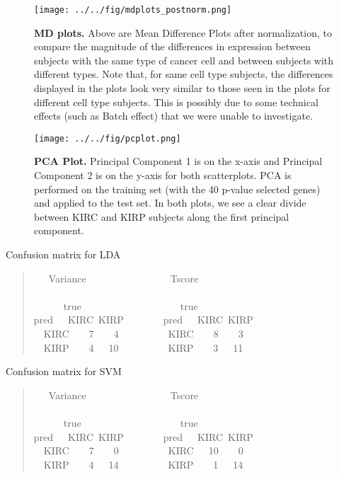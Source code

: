 \begin{figure}[H]
  \centering
    \texttt{[image: ../../fig/mdplots\_postnorm.png]}
\caption{\textbf{MD plots.} Above are Mean Difference Plots after normalization, to
  compare the magnitude of the differences in expression between subjects with
  the same type of cancer cell and between subjects with different types.  Note
  that, for same cell type subjects, the differences displayed in the plots look
  very similar to those seen in the plots for different cell type subjects. This
  is possibly due to some technical effects (such as Batch
  effect) that we were unable to investigate.}
   \label{fig:mdplot}
\end{figure}

\begin{figure}[H]
  \centering
    \texttt{[image: ../../fig/pcplot.png]}

\caption{\textbf{PCA Plot.} Principal Component 1 is on the x-axis and Principal
  Component 2 is on the y-axis for both scatterplots.  PCA is performed on the
  training set (with the 40 p-value selected genes) and applied to the test set.
  In both plots, we see a clear divide between 	KIRC and KIRP subjects along
  the first principal component.}
   \label{fig:pca}
\end{figure}

Confusion matrix for LDA

\vspace*{\fill}
\begin{quote}{  \ttfamily \raggedright \noindent
\centering
~~~Variance~~~~~~~~~~~~~~~~~Tscore\\
~\\
~~~~~~true~~~~~~~~~~~~~~~~~~~~true\\
pred~~~KIRC~KIRP~~~~~~~~pred~~~KIRC~KIRP\\
~~KIRC~~~~7~~~~4~~~~~~~~~~KIRC~~~~8~~~~3\\
~~KIRP~~~~4~~~10~~~~~~~~~~KIRP~~~~3~~~11\\
}
\end{quote}
\vspace*{\fill}

Confusion matrix for SVM
\vspace*{\fill} 
\begin{quote}{ \ttfamily \raggedright \noindent
\centering
~~~Variance~~~~~~~~~~~~~~~~~Tscore\\
~\\
~~~~~~true~~~~~~~~~~~~~~~~~~~~true\\
pred~~~KIRC~KIRP~~~~~~~~pred~~~KIRC~KIRP\\
~~KIRC~~~~7~~~~0~~~~~~~~~~KIRC~~~10~~~~0\\
~~KIRP~~~~4~~~14~~~~~~~~~~KIRP~~~~1~~~14\\
}
\end{quote}
\vspace*{\fill}


